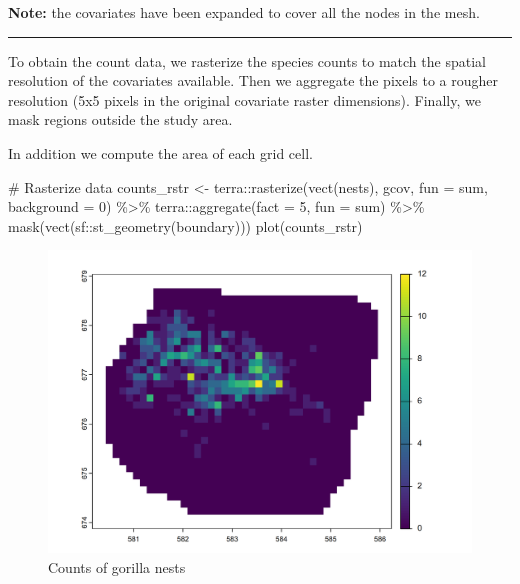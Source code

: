 \documentclass[
  letterpaper,
  DIV=11,
  numbers=noendperiod]{scrartcl}
\newenvironment{Shaded}{\begin{snugshade}}{\end{snugshade}}
\newcommand{\AttributeTok}[1]{\textcolor[rgb]{0.40,0.45,0.13}{#1}}
\newcommand{\CommentTok}[1]{\textcolor[rgb]{0.37,0.37,0.37}{#1}}
\newcommand{\DecValTok}[1]{\textcolor[rgb]{0.68,0.00,0.00}{#1}}
\newcommand{\FunctionTok}[1]{\textcolor[rgb]{0.28,0.35,0.67}{#1}}
\newcommand{\NormalTok}[1]{\textcolor[rgb]{0.00,0.23,0.31}{#1}}
\newcommand{\OtherTok}[1]{\textcolor[rgb]{0.00,0.23,0.31}{#1}}
\newcommand{\SpecialCharTok}[1]{\textcolor[rgb]{0.37,0.37,0.37}{#1}}
\begin{document}
\textbf{Note:} the covariates have been expanded to cover all the nodes
in the mesh.

\begin{center}\rule{0.5\linewidth}{0.5pt}\end{center}

To obtain the count data, we rasterize the species counts to match the
spatial resolution of the covariates available. Then we aggregate the
pixels to a rougher resolution (5x5 pixels in the original covariate
raster dimensions). Finally, we mask regions outside the study area.

In addition we compute the area of each grid cell.

\begin{Shaded}
\begin{Highlighting}[]
\CommentTok{\# Rasterize data}
\NormalTok{counts\_rstr }\OtherTok{\textless{}{-}}
\NormalTok{  terra}\SpecialCharTok{::}\FunctionTok{rasterize}\NormalTok{(}\FunctionTok{vect}\NormalTok{(nests), gcov, }\AttributeTok{fun =}\NormalTok{ sum, }\AttributeTok{background =} \DecValTok{0}\NormalTok{) }\SpecialCharTok{\%\textgreater{}\%}
\NormalTok{  terra}\SpecialCharTok{::}\FunctionTok{aggregate}\NormalTok{(}\AttributeTok{fact =} \DecValTok{5}\NormalTok{, }\AttributeTok{fun =}\NormalTok{ sum) }\SpecialCharTok{\%\textgreater{}\%}
  \FunctionTok{mask}\NormalTok{(}\FunctionTok{vect}\NormalTok{(sf}\SpecialCharTok{::}\FunctionTok{st\_geometry}\NormalTok{(boundary)))}
\FunctionTok{plot}\NormalTok{(counts\_rstr)}
\end{Highlighting}
\end{Shaded}

\begin{figure}[H]

{\centering \includegraphics[width=0.8\linewidth,height=\textheight,keepaspectratio]{day5_practical_8_files/figure-pdf/unnamed-chunk-65-1.png}

}

\caption{Counts of gorilla nests}

\end{figure}%
\end{document}

